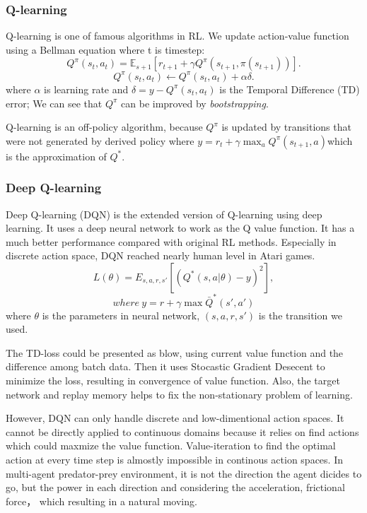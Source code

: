 \documentclass[11pt,twocolumn]{jarticle} %
\begin{document}
\subsubsection{Q-learning}

Q-learning is one of famous algorithms in RL. We update action-value function using a Bellman equation where t is timestep: 
\begin{equation}
Q^\pi(s_t, a_t) = \mathbb{E}_{s+1}[r_{t+1} + \gamma Q^\pi(s_{t+1}, \pi(s_{t+1}))].  
\end{equation}
\begin{equation}
Q^\pi(s_t, a_t) \leftarrow Q^\pi(s_t, a_t) + \alpha\delta.  
\end{equation}
where $\alpha$ is learning rate and $\delta = y - Q^\pi(s_t, a_t)$ is the Temporal Difference (TD) error; We can see that $Q^\pi$ can be improved by \textsl{bootstrapping}.\par 
Q-learning is an off-policy algorithm, because $Q^\pi$ is updated by transitions that were not generated by derived policy where $y = r_t + \gamma\max_a Q^\pi(s_{t+1}, a)$which is the approximation of $Q^*$.
\subsubsection{Deep Q-learning}

Deep Q-learning (DQN) \cite{10} is the extended version of Q-learning using deep learning. It uses a deep neural network to work as the Q value function. 
It has a much better performance compared with original RL methods. Especially in discrete action space, DQN reached nearly human level in Atari games.
\begin{equation}
L(\theta) = E_{s,a,r,s'}[(Q^*(s, a|\theta) - y)^2],  
\end{equation}
$$where\ y = r + \gamma\max \bar{Q}^*(s', a')$$
where $\theta$ is the parameters in neural network, $(s,a,r,s')$ is the transition we used. \par
The TD-loss could be presented as blow, using current value function and the difference among batch data. Then it uses Stocastic Gradient Desecent to minimize the loss, resulting in convergence of value function. Also, the target network and replay memory helps to fix the non-stationary problem of learning. \par
However, DQN can only handle discrete and low-dimentional action spaces. It cannot be directly applied to continuous domains because it relies on find actions which could maxmize the value function. Value-iteration to find the optimal action at every time step is almostly impossible in continous action spaces. In multi-agent predator-prey environment, it is not the direction the agent dicides to go, but the power in each direction and considering the acceleration, frictional force， which resulting in a natural moving.
\end{document}
